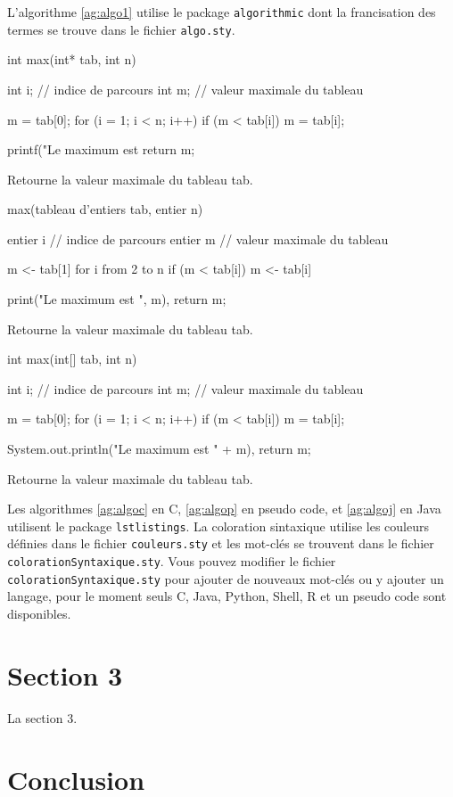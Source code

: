 L'algorithme \ref{ag:algo1} utilise le package \texttt{algorithmic} dont la francisation des termes se trouve dans le fichier \texttt{algo.sty}.

\begin{algorithm}
  \begin{C}
int max(int* tab, int n) {
  int i; // indice de parcours
  int m; // valeur maximale du tableau
  
  m = tab[0];
  for (i = 1; i < n; i++) {
    if (m < tab[i]) {
      m = tab[i];
    }
  }
  
  printf("Le maximum est %
  return m;
}
  \end{C}
  \caption[Algo en C]{Retourne la valeur maximale du tableau tab.\label{ag:algoc}}
\end{algorithm}

\begin{algorithm}
  \begin{PseudoCode}
max(tableau d'entiers tab, entier n) {
  entier i // indice de parcours
  entier m // valeur maximale du tableau
  
  m <- tab[1]
  for i from 2 to n {
    if (m < tab[i]) {
      m <- tab[i]
    }
  }
  
  print("Le maximum est ", m),
  return m;
}
  \end{PseudoCode}
  \caption[Algo en PseudoCode]{Retourne la valeur maximale du tableau tab.\label{ag:algop}}
\end{algorithm}

\begin{algorithm}
  \begin{Java}
int max(int[] tab, int n) {
  int i; // indice de parcours
  int m; // valeur maximale du tableau
  
  m = tab[0];
  for (i = 1; i < n; i++) {
    if (m < tab[i]) {
      m = tab[i];
    }
  }
  
  System.out.println("Le maximum est " + m),
  return m;
}
  \end{Java}
  \caption[Algo en Java]{Retourne la valeur maximale du tableau tab.\label{ag:algoj}}
\end{algorithm}

Les algorithmes \ref{ag:algoc} en C, \ref{ag:algop} en pseudo code, et \ref{ag:algoj} en Java utilisent le package \texttt{lstlistings}. La coloration sintaxique utilise les couleurs définies dans le fichier \texttt{couleurs.sty} et les mot-clés se trouvent dans le fichier \texttt{colorationSyntaxique.sty}. Vous pouvez modifier le fichier \texttt{colorationSyntaxique.sty} pour ajouter de nouveaux mot-clés ou y ajouter un langage, pour le moment seuls C, Java, Python, Shell, R et un pseudo code sont disponibles.

\section{Section 3}

La section 3.

\section{Conclusion}
